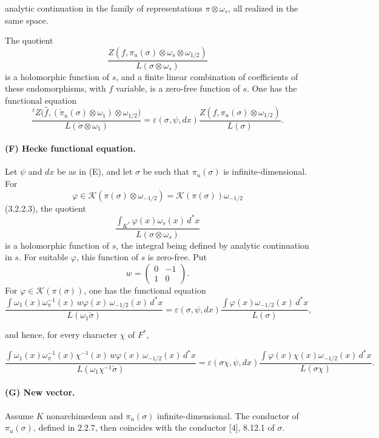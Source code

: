 \documentclass[10pt,a4paper]{article}
\providecommand{\cK}{\mathcal K}
\begin{document}
\clearpage
{}
\hypertarget{authority-44}{}
analytic continuation in the family of representations \(\pi\otimes\omega_s\), all realized in the same space.

The quotient
\[
\frac{Z(f,\pi_u(\sigma)\otimes\omega_s\otimes\omega_{1/2})}
     {L(\sigma\otimes\omega_s)}
\]
is a holomorphic function of \(s\), and a finite linear combination of coefficients of these endomorphisms, with \(f\) variable, is a zero-free function of \(s\). One has the functional equation
\[
\frac{{}^{t}Z\bigl(\widehat f,(\check{\pi}_u(\sigma)\otimes\omega_1)\otimes\omega_{1/2}\bigr)}
     {L(\check\sigma\otimes\omega_1)}
=
\varepsilon(\sigma,\psi,dx)
\frac{Z(f,\pi_u(\sigma)\otimes\omega_{1/2})}{L(\sigma)}.
\]

\paragraph{(F) Hecke functional equation.} Let \(\psi\) and \(dx\) be as in (E), and let \(\sigma\) be such that \(\pi_u(\sigma)\) is infinite-dimensional. For
\[
\varphi\in\cK(\pi(\sigma)\otimes\omega_{-1/2})=
\cK(\pi(\sigma))\omega_{-1/2}
\]
(3.2.2.3), the quotient
\[
\frac{\displaystyle\int_{K^*}\varphi(x)\omega_s(x)\,d^*x}
     {L(\sigma\otimes\omega_s)}
\]
is a holomorphic function of \(s\), the integral being defined by analytic continuation in \(s\). For suitable \(\varphi\), this function of \(s\) is zero-free. Put
\[
w=\begin{pmatrix}0&-1\\1&0\end{pmatrix}.
\]
For \(\varphi\in\cK(\pi(\sigma))\), one has the functional equation
\[
\frac{\displaystyle\int \omega_1(x)\omega_\pi^{-1}(x)\,w\varphi(x)\,\omega_{-1/2}(x)\,d^*x}
     {L(\omega_1\check\sigma)}
=
\varepsilon(\sigma,\psi,dx)
\frac{\displaystyle\int\varphi(x)\omega_{-1/2}(x)\,d^*x}{L(\sigma)},
\]

and hence, for every character \(\chi\) of \(F^*\),

\clearpage
{}
\hypertarget{authority-45}{}
\[
\frac{\displaystyle\int \omega_1(x)\omega_\pi^{-1}(x)\chi^{-1}(x)\,w\varphi(x)\,\omega_{-1/2}(x)\,d^*x}
     {L(\omega_1\chi^{-1}\check\sigma)}
=
\varepsilon(\sigma\chi,\psi,dx)
\frac{\displaystyle\int\varphi(x)\chi(x)\omega_{-1/2}(x)\,d^*x}{L(\sigma\chi)}.
\]

\paragraph{(G) New vector.} Assume \(K\) nonarchimedean and \(\pi_u(\sigma)\) infinite-dimensional. The conductor of \(\pi_u(\sigma)\), defined in 2.2.7, then coincides with the conductor [4], 8.12.1 of \(\sigma\).
\end{document}
